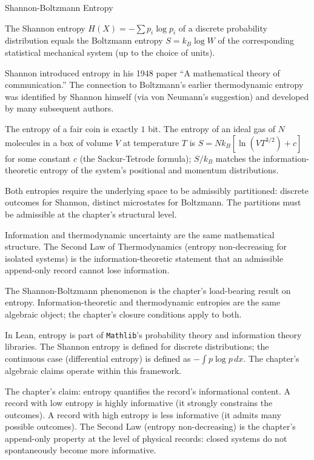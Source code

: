 \begin{phenom}{Shannon-Boltzmann Entropy}
\label{ph:shannon-boltzmann-entropy}

\PhStatement The Shannon entropy $H(X) = -\sum p_i \log p_i$ of a
discrete probability distribution equals the Boltzmann entropy
$S = k_B \log W$ of the corresponding statistical mechanical
system (up to the choice of units).

\PhOrigin Shannon introduced entropy in his 1948 paper ``A
mathematical theory of communication.'' The connection to
Boltzmann's earlier thermodynamic entropy was identified by
Shannon himself (via von Neumann's suggestion) and developed by
many subsequent authors.

\PhObservation The entropy of a fair coin is exactly $1$ bit. The
entropy of an ideal gas of $N$ molecules in a box of volume $V$
at temperature $T$ is $S = N k_B [\ln(V T^{3/2}) + c]$ for some
constant $c$ (the Sackur-Tetrode formula); $S/k_B$ matches the
information-theoretic entropy of the system's positional and
momentum distributions.

\PhConstraint Both entropies require the underlying space to be
admissibly partitioned: discrete outcomes for Shannon, distinct
microstates for Boltzmann. The partitions must be admissible at
the chapter's structural level.

\PhConsequence Information and thermodynamic uncertainty are the
same mathematical structure. The Second Law of Thermodynamics
(entropy non-decreasing for isolated systems) is the
information-theoretic statement that an admissible append-only
record cannot lose information.

\end{phenom}

The Shannon-Boltzmann phenomenon is the chapter's load-bearing
result on entropy. Information-theoretic and thermodynamic
entropies are the same algebraic object; the chapter's
closure conditions apply to both.

In Lean, entropy is part of \texttt{Mathlib}'s probability
theory and information theory libraries. The Shannon entropy is
defined for discrete distributions; the continuous case
(differential entropy) is defined as $-\int p \log p \, dx$.
The chapter's algebraic claims operate within this framework.

The chapter's claim: entropy quantifies the record's
informational content. A record with low entropy is highly
informative (it strongly constrains the outcomes). A record
with high entropy is less informative (it admits many possible
outcomes). The Second Law (entropy non-decreasing) is the
chapter's append-only property at the level of physical
records: closed systems do not spontaneously become more
informative.

